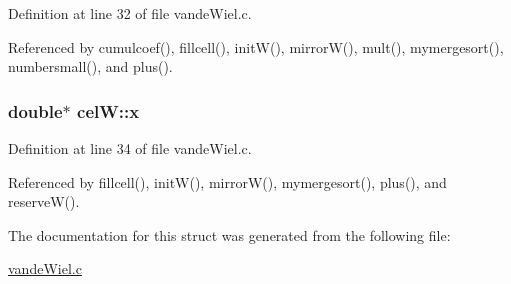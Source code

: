 Definition at line 32 of file vandeWiel.c.

Referenced by cumulcoef(), fillcell(), initW(), mirrorW(), mult(), mymergesort(), numbersmall(), and plus().\hypertarget{structcelW_b443b2a7120f170c2c5e8012f4dd86d7}{
\subsubsection[{x}]{\setlength{\rightskip}{0pt plus 5cm}double$\ast$ {\bf celW::x}}}
\label{structcelW_b443b2a7120f170c2c5e8012f4dd86d7}




Definition at line 34 of file vandeWiel.c.

Referenced by fillcell(), initW(), mirrorW(), mymergesort(), plus(), and reserveW().

The documentation for this struct was generated from the following file:\begin{CompactItemize}
\item 
\hyperlink{vandeWiel_8c}{vandeWiel.c}\end{CompactItemize}
